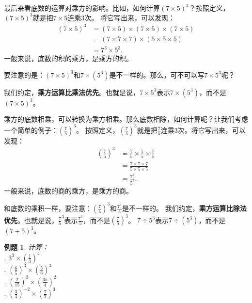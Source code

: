 \documentclass[12pt,UTF8]{ctexbook}
\newtheorem{et}{例题}[section]
\begin{document}
最后来看底数的运算对乘方的影响。比如，如何计算$(7\times 5)^3$？按照定义，$(7\times 5)^3$就是把$7\times 5$连乘$3$次。
将它写出来，可以发现：
\begin{align*}
    (7\times 5)^3 &= (7\times 5) \times (7\times 5) \times (7\times 5) \\
    &= (7 \times 7 \times 7) \times (5 \times 5 \times 5) \\
    &= 7^3 \times 5^3.
\end{align*}
一般来说，底数的积的乘方，是乘方的积。

要注意的是：$(7\times 5)^3$和$7\times (5^3)$是不一样的。那么，可不可以写$7\times 5^3$呢？

我们约定，\textbf{乘方运算比乘法优先}。也就是说，$7\times 5^3$表示$7\times (5^3)$，而不是$(7\times 5)^3$。

乘方的底数相乘，可以转换为乘方相乘。那么底数相除，如何计算呢？让我们考虑一个简单的例子：$\left(\frac{7}{5}\right)^3$。
按照定义，$\left(\frac{7}{5}\right)^3$就是把$\frac{7}{5}$连乘$3$次。将它写出来，可以发现：
\begin{align*}
    \left(\frac{7}{5}\right)^3 &= \frac{7}{5} \times \frac{7}{5} \times \frac{7}{5} \\
    &= \frac{7\times 7\times 7}{5\times 5\times 5} \\
    &= \frac{7^3}{5^3}.
\end{align*}
一般来说，底数的商的乘方，是乘方的商。

和底数的乘积一样，要注意：$\left(\frac{7}{5}\right)^3$和$\frac{7^3}{5}$是不一样的。
我们约定，\textbf{乘方运算比除法优先}。也就是说，$\frac{7}{5}^3$表示$\frac{7^3}{5}$，而不是$\left(\frac{7}{5}\right)^3$。
$7\div 5^3$表示$7\div (5^3)$，而不是$(7\div 5)^3$。

\begin{et}
    计算：\\
    . $3^3 \times \left(\frac{1}{3}\right)^4$  \\
    . $\left(\frac{6}{5}\right)^3\times \left(\frac{5}{6}\right)^3$ \\
    . $\left(\frac{2}{15}\right)^3\times \left(\frac{35}{4}\right)^2$ \\
    . $\left(\frac{3}{4}\right)^{-2}\times \left(\frac{7}{2}\right)^3$ 
\end{et}
\end{document}
